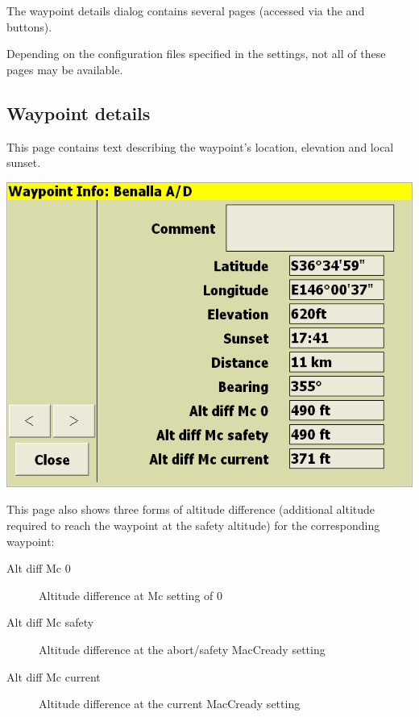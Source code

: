 \documentclass[a4paper,12pt]{refrep}
\begin{document}
The waypoint details dialog contains several pages (accessed via the
\button{$>$} and \button{$<$} buttons).

Depending on the configuration files specified in the settings, not
all of these pages may be available.

\subsection*{Waypoint details}
This page contains text describing the waypoint's location, elevation
and local sunset.  
\begin{center}
\includegraphics[angle=0,width=\linewidth,keepaspectratio='true']{figures/dialog-waypointdetails0.png}
\end{center}

This page also shows three forms of altitude difference (additional
altitude required to reach the waypoint at the safety altitude) for
the corresponding waypoint:
\begin{description}
\item[Alt diff Mc 0] Altitude difference at Mc setting of 0
\item[Alt diff Mc safety] Altitude difference at the abort/safety MacCready setting
\item[Alt diff Mc current] Altitude difference at the current MacCready setting
\end{description}
\end{document}

